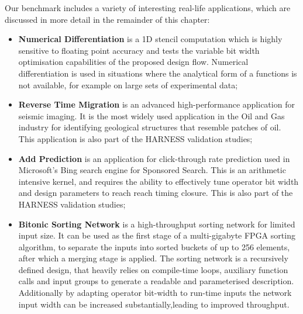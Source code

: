 Our benchmark includes a variety of interesting real-life
applications, which are discussed in more detail in the remainder of
this chapter:
\begin{itemize}
\item \textbf{Numerical Differentiation} is a 1D stencil computation which
  is highly sensitive to floating point accuracy and tests the
  variable bit width optimisation capabilities of the proposed design
  flow. Numerical differentiation is used in situations where the
  analytical form of a functions is not available, for example on
  large sets of experimental data;

\item \textbf{Reverse Time Migration} is an advanced high-performance
  application for seismic imaging. It is the most widely used
  application in the Oil and Gas industry for identifying geological
  structures that resemble patches of oil. This application is also
  part of the HARNESS validation studies;
\item \textbf{Add Prediction} is an application for click-through rate
  prediction used in Microsoft's Bing search engine for Sponsored
  Search. This is an arithmetic intensive kernel, and requires the
  ability to effectively tune operator bit width and design parameters
  to reach reach timing closure. This is also part of the HARNESS
  validation studies;
\item \textbf{Bitonic Sorting Network} is a high-throughput sorting
  network for limited input size. It can be used as the first stage of
  a multi-gigabyte FPGA sorting algorithm, to separate the inputs into
  sorted buckets of up to 256 elements, after which a merging stage is
  applied. The sorting network is a recursively defined design, that
  heavily relies on compile-time loops, auxiliary function calls and
  input groups to generate a readable and parameterised
  description. Additionally by adapting operator bit-width to run-time
  inputs the network input width can be increased
  substantially,leading to improved throughput.
\end{itemize}

